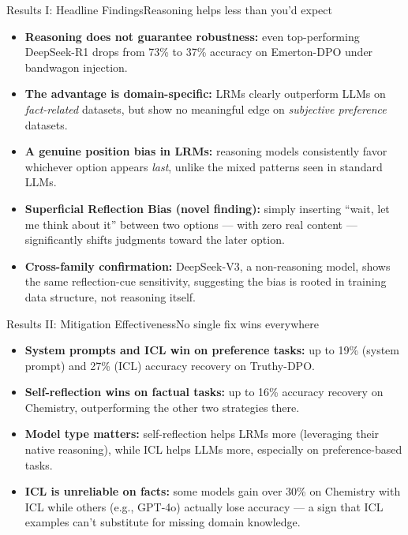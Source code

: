 \documentclass[10pt]{beamer}
\begin{document}
	\begin{frame}{Results I: Headline Findings}{Reasoning helps less than you'd expect}
	\begin{itemize}
		\item \textbf{Reasoning does not guarantee robustness:} even top-performing DeepSeek-R1 drops from 73\% to 37\% accuracy on Emerton-DPO under bandwagon injection.
		\item \textbf{The advantage is domain-specific:} LRMs clearly outperform LLMs on \emph{fact-related} datasets, but show no meaningful edge on \emph{subjective preference} datasets.
		\item \textbf{A genuine position bias in LRMs:} reasoning models consistently favor whichever option appears \emph{last}, unlike the mixed patterns seen in standard LLMs.
		\item \textbf{Superficial Reflection Bias (novel finding):} simply inserting ``wait, let me think about it'' between two options — with zero real content — significantly shifts judgments toward the later option.
		\item \textbf{Cross-family confirmation:} DeepSeek-V3, a non-reasoning model, shows the same reflection-cue sensitivity, suggesting the bias is rooted in training data structure, not reasoning itself.
	\end{itemize}
	\end{frame}

	\begin{frame}{Results II: Mitigation Effectiveness}{No single fix wins everywhere}
	\begin{itemize}
		\item \textbf{System prompts and ICL win on preference tasks:} up to 19\% (system prompt) and 27\% (ICL) accuracy recovery on Truthy-DPO.
		\item \textbf{Self-reflection wins on factual tasks:} up to 16\% accuracy recovery on Chemistry, outperforming the other two strategies there.
		\item \textbf{Model type matters:} self-reflection helps LRMs more (leveraging their native reasoning), while ICL helps LLMs more, especially on preference-based tasks.
		\item \textbf{ICL is unreliable on facts:} some models gain over 30\% on Chemistry with ICL while others (e.g., GPT-4o) actually lose accuracy — a sign that ICL examples can't substitute for missing domain knowledge.
	\end{itemize}
	\end{frame}
\end{document}
